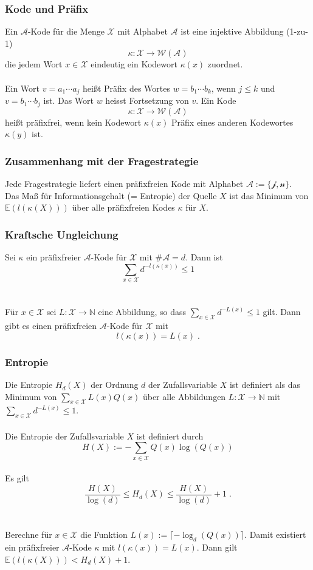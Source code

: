 \documentclass[a4paper]{article}
\begin{document}
\subsubsection{Kode und Präfix}
Ein $\mathcal{A}$-Kode für die Menge $\mathcal{X}$ mit Alphabet $\mathcal{A}$ ist eine injektive Abbildung (1-zu-1)
$$ \kappa : \mathcal{X} \to \mathcal{W} (\mathcal{A})$$
die jedem Wort $x \in \mathcal{X}$ eindeutig ein Kodewort $\kappa(x)$ zuordnet.\\\\
Ein Wort $v = a_1 \cdots a_j$ heißt Präfix des Wortes $w = b_1 \cdots b_k$, wenn $j \leq k$ und $v = b_1 \cdots b_j$ ist. Das Wort $w$ heisst Fortsetzung von $v$. Ein Kode $$ \kappa : \mathcal{X} \to \mathcal{W} (\mathcal{A})$$
 heißt präfixfrei, wenn kein Kodewort $\kappa(x)$ Präfix eines anderen Kodewortes $\kappa(y)$ ist. 

\subsubsection{Zusammenhang mit der Fragestrategie}
Jede Fragestrategie liefert einen präfixfreien Kode mit Alphabet $\mathcal{A := \{  \text{j} ,\text{n} \}}$.\\
Das Maß für Informationsgehalt (= Entropie) der Quelle $X$ ist das Minimum von $\mathbb{E}(l(\kappa (X)))$ über alle präfixfreien Kodes $\kappa$ für $X$.

\subsubsection{Kraftsche Ungleichung}
Sei $\kappa$ ein präfixfreier $\mathcal{A}$-Kode für $\mathcal{X}$ mit $\# \mathcal{A} = d$. Dann ist
$$ \sum_{x \in \mathcal{X} }  d^{-l( \kappa(x))} \leq 1$$\\\\
Für $x \in \mathcal{X}$ sei $L : \mathcal{X} \to \mathbb{N}$ eine Abbildung, so dass $ \sum_{x \in \mathcal{X} }  d^{-L(x)} \leq 1$ gilt. Dann gibt es einen präfixfreien  $\mathcal{A}$-Kode für $\mathcal{X}$ mit 
$$ l(\kappa(x)) = L(x) \; .$$

\subsubsection{Entropie}
Die Entropie $H_d(X)$ der Ordnung $d$ der Zufallsvariable $X$ ist definiert als das Minimum von $\sum_{x \in \mathcal{X} }  L(x) Q(x)$ über alle Abbildungen $L: \mathcal{X} \to \mathbb{N}$ mit \mbox{$\sum_{x \in \mathcal{X} }  d^{-L(x)} \leq 1$.}\\\\
Die Entropie der Zufallsvariable $X$ ist definiert durch 
$$ H(X) := -\sum_{x \in \mathcal{X} }   Q(x) \log(Q(x))$$\\
Es gilt
$$ \frac{H(X)}{\log(d)} \leq H_d(X) \leq \frac{H(X)}{\log(d)} +1 \; .$$\\\\
Berechne für $x \in \mathcal{X}$ die Funktion $L(x) := \lceil -\log_d(Q(x)) \rceil$. Damit existiert ein präfixfreier $\mathcal{A}$-Kode
$\kappa$ mit $l(\kappa(x)) = L(x)$. Dann gilt $\mathbb{E}(l(\kappa(X))) < H_d(X) +1$.
\end{document}
